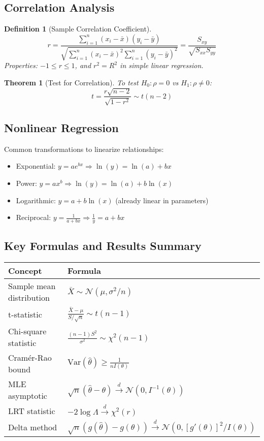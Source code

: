 \documentclass[12pt,a4paper]{amsart}
\newtheorem{theorem}{Theorem}[section]
\newtheorem{definition}{Definition}[section]
\theoremstyle{remark}
\begin{document}
\subsection{Correlation Analysis}

\begin{definition}[Sample Correlation Coefficient]
$$r = \frac{\sum_{i=1}^n (x_i - \bar{x})(y_i - \bar{y})}{\sqrt{\sum_{i=1}^n (x_i - \bar{x})^2 \sum_{i=1}^n (y_i - \bar{y})^2}} = \frac{S_{xy}}{\sqrt{S_{xx}S_{yy}}}$$
Properties: $-1 \leq r \leq 1$, and $r^2 = R^2$ in simple linear regression.
\end{definition}

\begin{theorem}[Test for Correlation]
To test $H_0: \rho = 0$ vs $H_1: \rho \neq 0$:
$$t = \frac{r\sqrt{n-2}}{\sqrt{1-r^2}} \sim t(n-2)$$
\end{theorem}

\subsection{Nonlinear Regression}

Common transformations to linearize relationships:
\begin{itemize}
\item Exponential: $y = ae^{bx} \Rightarrow \ln(y) = \ln(a) + bx$
\item Power: $y = ax^b \Rightarrow \ln(y) = \ln(a) + b\ln(x)$
\item Logarithmic: $y = a + b\ln(x)$ (already linear in parameters)
\item Reciprocal: $y = \frac{1}{a + bx} \Rightarrow \frac{1}{y} = a + bx$
\end{itemize}

\subsection{Key Formulas and Results Summary}

\begin{table}[h]
\centering
\begin{tabular}{|l|l|}
\hline
\textbf{Concept} & \textbf{Formula} \\
\hline
Sample mean distribution & $\bar{X} \sim \mathcal{N}(\mu, \sigma^2/n)$ \\
\hline
t-statistic & $\frac{\bar{X} - \mu}{S/\sqrt{n}} \sim t(n-1)$ \\
\hline
Chi-square statistic & $\frac{(n-1)S^2}{\sigma^2} \sim \chi^2(n-1)$ \\
\hline
Cramér-Rao bound & $\text{Var}(\hat{\theta}) \geq \frac{1}{nI(\theta)}$ \\
\hline
MLE asymptotic & $\sqrt{n}(\hat{\theta} - \theta) \stackrel{d}{\to} \mathcal{N}(0, I^{-1}(\theta))$ \\
\hline
LRT statistic & $-2\log\Lambda \stackrel{d}{\to} \chi^2(r)$ \\
\hline
Delta method & $\sqrt{n}(g(\hat{\theta}) - g(\theta)) \stackrel{d}{\to} \mathcal{N}(0, [g'(\theta)]^2/I(\theta))$ \\
\hline
\end{tabular}
\end{table}
\end{document}
